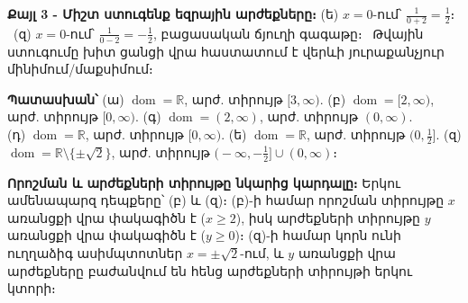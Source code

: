 \documentclass[11pt,a4paper]{article}
\newcommand{\R}{\mathbb{R}}
\newcommand{\dom}{\operatorname{dom}}
\newcommand{\answer}[1]{\begin{answerbox}\centering\textbf{Պատասխան՝}\quad #1\end{answerbox}}
\begin{document}
\textbf{Քայլ 3 - Միշտ ստուգենք եզրային արժեքները։}
(ե) $x=0$-ում՝ $\tfrac1{0+2}=\tfrac12$։ \checkmark\ (զ) $x=0$-ում՝ $\tfrac1{0-2}=-\tfrac12$, բացասական
ճյուղի գագաթը։ \checkmark\ Թվային ստուգումը խիտ ցանցի վրա հաստատում է վերևի յուրաքանչյուր մինիմում/մաքսիմում։

\answer{%
(ա) $\dom=\R$, արժ. տիրույթ $[3,\infty)$.\quad
(բ) $\dom=[2,\infty)$, արժ. տիրույթ $[0,\infty)$.\quad
(գ) $\dom=(2,\infty)$, արժ. տիրույթ $(0,\infty)$.\\[2pt]
(դ) $\dom=\R$, արժ. տիրույթ $[0,\infty)$.\quad
(ե) $\dom=\R$, արժ. տիրույթ $\bigl(0,\tfrac12\bigr]$.\quad
(զ) $\dom=\R\setminus\{\pm\sqrt2\}$, արժ. տիրույթ $\bigl(-\infty,-\tfrac12\bigr]\cup(0,\infty)$։}

\medskip
\textbf{Որոշման և արժեքների տիրույթը նկարից կարդալը։} Երկու ամենապարզ դեպքերը՝ (բ) և (զ)։ (բ)-ի համար
որոշման տիրույթը $x$ առանցքի վրա փակագիծն է ($x\ge2$), իսկ արժեքների տիրույթը $y$ առանցքի վրա
փակագիծն է ($y\ge0$)։ (զ)-ի համար կորն ունի ուղղաձիգ ասիմպտոտներ $x=\pm\sqrt2$-ում, և $y$ առանցքի
վրա արժեքները բաժանվում են հենց արժեքների տիրույթի երկու կտորի։
\end{document}
